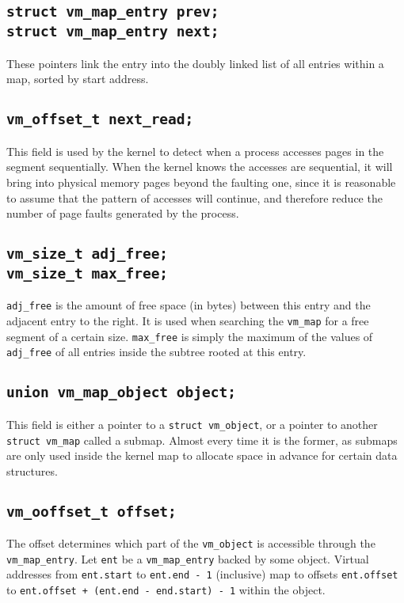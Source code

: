 \documentclass[shortabstract, english]{iithesis}
\begin{document}
\subsection*{\texttt{struct vm_map_entry prev;}\\
  \texttt{struct vm_map_entry next;}}
These pointers link the entry into the doubly linked list of all entries within
a map, sorted by start address.

\subsection*{\texttt{vm_offset_t next_read;}}
This field is used by the kernel to detect when a process accesses pages in the
segment sequentially. When the kernel knows the accesses are sequential, it will
bring into physical memory pages beyond the faulting one, since it is reasonable
to assume that the pattern of accesses will continue, and therefore reduce the
number of page faults generated by the process.

\subsection*{\texttt{vm_size_t adj_free;}\\
  \texttt{vm_size_t max_free;}}
\texttt{adj_free} is the amount of free space (in bytes) between this
entry and the adjacent entry to the right. It is used when searching the
\texttt{vm_map} for a free segment of a certain size.
\texttt{max_free} is simply the maximum of the values of
\texttt{adj_free} of all entries inside the subtree rooted at this entry.

\subsection*{\texttt{union vm_map_object object;}}
This field is either a pointer to a \texttt{struct vm_object}, or a
pointer to another \texttt{struct vm_map} called a submap. Almost every
time it is the former, as submaps are only used inside the kernel map to
allocate space in advance for certain data structures.

\subsection*{\texttt{vm_ooffset_t offset;}}
The offset determines which part of the \texttt{vm_object} is accessible
through the \texttt{vm_map_entry}. Let \texttt{ent} be a
\texttt{vm_map_entry} backed by some object. Virtual addresses from
\texttt{ent.start} to \texttt{ent.end - 1} (inclusive) map to
offsets \texttt{ent.offset} to
\texttt{ent.offset + (ent.end - end.start) - 1}
within the object.
\end{document}
